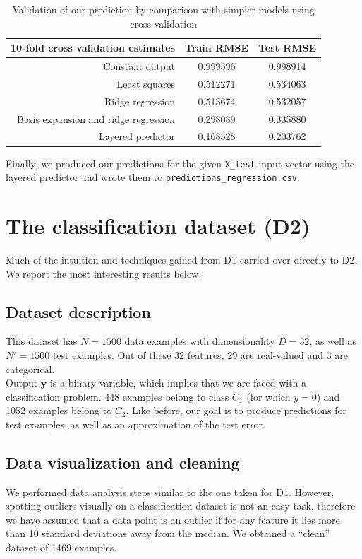 \documentclass{article} %
\begin{document}
  \begin{table}[ht]
    \center
    \begin{tabular}{|r|c|c|}
      \hline
      \textbf{10-fold cross validation estimates} & Train RMSE & Test RMSE \\
      \hline
      Constant output                             & 0.999596   & 0.998914  \\
      \hline
      Least squares                               & 0.512271   & 0.534063  \\
      \hline
      Ridge regression                            & 0.513674   & 0.532057  \\
      \hline
      Basis expansion and ridge regression        & 0.298089   & 0.335880  \\
      \hline
      Layered predictor                           & 0.168528   & 0.203762  \\
      \hline
    \end{tabular}
    \caption{Validation of our prediction by comparison with simpler models using cross-validation}
    \label{predictor-validation}
  \end{table}

  Finally, we produced our predictions for the given \texttt{X\_test} input vector using the layered predictor and wrote them to \texttt{predictions\_regression.csv}.

\section{The classification dataset (D2)}
  Much of the intuition and techniques gained from D1 carried over directly to D2. We report the most interesting results below.

  \subsection{Dataset description}
  This dataset has $N = 1500$ data examples with dimensionality $D = 32$, as well as $N' = 1500$ test examples. Out of these 32 features, 29 are real-valued and 3 are categorical.\\
  Output $\mathbf{y}$ is a binary variable, which implies that we are faced with a classification problem. 448 examples belong to class $C_1$ (for which $y = 0$) and 1052 examples belong to $C_2$. Like before, our goal is to produce predictions for test examples, as well as an approximation of the test error.

  \subsection{Data visualization and cleaning}
  We performed data analysis steps similar to the one taken for D1. However, spotting outliers visually on a classification dataset is not an easy task, therefore we have assumed that a data point is an outlier if for any feature it lies more than 10 standard deviations away from the median. We obtained a ``clean'' dataset of 1469 examples.
\end{document}
